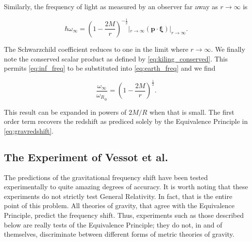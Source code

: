 \documentclass[11pt]{article}
\begin{document}
Similarly, the frequency of light as measured by an observer far away as $r \rightarrow \infty$ is

\begin{equation}
    \label{eq:inf_freq}
    \hbar \omega_{\infty} = \left(1 - \frac{2M}{r}\right)^{-\frac{1}{2}} |_{r \rightarrow \infty} \left(\boldsymbol{p} \cdot \boldsymbol{\xi}\right)|_{r \rightarrow \infty}.
\end{equation}

The Schwarzchild coefficient reduces to one in the limit where $r \rightarrow \infty$. We finally note the conserved scalar product as defined by \eqref{eq:kiling_conserved}. This permits \eqref{eq:inf_freq} to be substituted into \eqref{eq:earth_freq} and we find

\begin{equation}
   \frac{\omega_{\infty}}{\omega_{R_{\oplus}}} = \left(1 - \frac{2M}{r}\right)^{\frac{1}{2}}.
\end{equation}

This result can be expanded in powers of $2M/R$ when that is small. The first order term recovers the redshift as prediced solely by the Equivalence Principle in \eqref{eq:gravredshift}.\\

\subsection{The Experiment of Vessot et al.}

The predictions of the gravitational frequency shift have been tested experimentally to quite amazing degrees of accuracy. It is worth noting that these experiments do not strictly test General Relativity. In fact, that is the entire point of this problem. All theories of gravity, that agree with the Equivalence Principle, predict the frequency shift. Thus, experiments such as those described below are really tests of the Equivalence Principle; they do not, in and of themselves, discriminate between different forms of metric theories of gravity.
\end{document}
